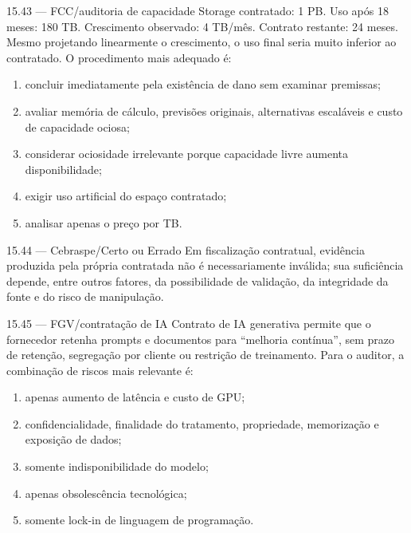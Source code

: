 \begin{questao}{ 15.43 — FCC/auditoria de capacidade}
Storage contratado: 1 PB. Uso após 18 meses: 180 TB. Crescimento observado: 4 TB/mês. Contrato restante: 24 meses. Mesmo projetando linearmente o crescimento, o uso final seria muito inferior ao contratado. O procedimento mais adequado é:
\begin{enumerate}[label=\Alph*)]
\item concluir imediatamente pela existência de dano sem examinar premissas;
\item avaliar memória de cálculo, previsões originais, alternativas escaláveis e custo de capacidade ociosa;
\item considerar ociosidade irrelevante porque capacidade livre aumenta disponibilidade;
\item exigir uso artificial do espaço contratado;
\item analisar apenas o preço por TB.
\end{enumerate}
\end{questao}

\begin{questao}{ 15.44 — Cebraspe/Certo ou Errado}
Em fiscalização contratual, evidência produzida pela própria contratada não é necessariamente inválida; sua suficiência depende, entre outros fatores, da possibilidade de validação, da integridade da fonte e do risco de manipulação.
\end{questao}

\begin{questao}{ 15.45 — FGV/contratação de IA}
Contrato de IA generativa permite que o fornecedor retenha prompts e documentos para ``melhoria contínua'', sem prazo de retenção, segregação por cliente ou restrição de treinamento. Para o auditor, a combinação de riscos mais relevante é:
\begin{enumerate}[label=\Alph*)]
\item apenas aumento de latência e custo de GPU;
\item confidencialidade, finalidade do tratamento, propriedade, memorização e exposição de dados;
\item somente indisponibilidade do modelo;
\item apenas obsolescência tecnológica;
\item somente lock-in de linguagem de programação.
\end{enumerate}
\end{questao}


